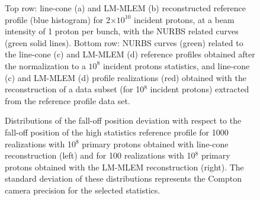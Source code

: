 \begin{figure}
\caption{Top row: line-cone (a) and LM-MLEM (b) reconstructed reference profile (blue histogram) for 2$\times10^{10}$ incident protons, at a beam intensity of 1 proton per bunch, with the NURBS related curves (green solid lines). Bottom row: NURBS curves (green) related to the line-cone (c) and LM-MLEM (d) reference profiles obtained after the normalization to a $10^8$ incident protons statistics, and line-cone (c) and LM-MLEM (d) profile realizations (red) obtained with the reconstruction of a data subset (for 10$^{8}$ incident protons) extracted from the reference profile data set.}
\end{figure}

\begin{figure}
  \centering
  \caption{Distributions of the fall-off position deviation with respect to the fall-off position of the high statistics reference profile for 1000 realizations with 10$^8$ primary protons obtained with line-cone reconstruction (left) and for 100 realizations with 10$^8$ primary protons obtained with the LM-MLEM reconstruction (right). The standard deviation of these distributions represents the Compton camera precision for the selected statistics.}
\end{figure}

